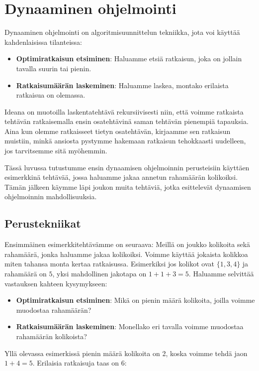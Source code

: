 \chapter{Dynaaminen ohjelmointi}

Dynaaminen ohjelmointi on algoritmisuunnittelun tekniikka,
jota voi käyttää kahdenlaisissa tilanteissa:

\begin{itemize}
\item \textbf{Optimiratkaisun etsiminen}: Haluamme etsiä ratkaisun,
joka on jollain tavalla suurin tai pienin.
\item \textbf{Ratkaisumäärän laskeminen}: Haluamme laskea,
montako erilaista ratkaisua on olemassa.
\end{itemize}

Ideana on muotoilla laskentatehtävä
rekursiivisesti niin, että voimme ratkaista tehtävän
ratkaisemalla ensin osatehtävinä saman tehtävän pienempiä tapauksia.
Aina kun olemme ratkaisseet tietyn osatehtävän,
kirjaamme sen ratkaisun muistiin, minkä ansiosta
pystymme hakemaan ratkaisun tehokkaasti uudelleen,
jos tarvitsemme sitä myöhemmin.

Tässä luvussa tutustumme ensin dynaamisen ohjelmoinnin perusteisiin
käyttäen esimerkkinä tehtävää, jossa haluamme jakaa annetun
rahamäärän kolikoiksi.
Tämän jälkeen käymme läpi joukon muita tehtäviä, jotka esittelevät
dynaamisen ohjelmoinnin mahdollisuuksia.

\section{Perustekniikat}

Ensimmäinen esimerkkitehtävämme on seuraava:
Meillä on joukko kolikoita sekä rahamäärä,
jonka haluamme jakaa kolikoiksi.
Voimme käyttää jokaista kolikkoa miten tahansa
monta kertaa ratkaisussa.
Esimerkiksi jos kolikot ovat $\{1,3,4\}$
ja rahamäärä on $5$, yksi mahdollinen
jakotapa on $1+1+3=5$.
Haluamme selvittää vastauksen kahteen kysymykseen:

\begin{itemize}
\item \textbf{Optimiratkaisun etsiminen}:
Mikä on pienin määrä kolikoita, joilla voimme muodostaa rahamäärän?
\item \textbf{Ratkaisumäärän laskeminen}:
Monellako eri tavalla voimme muodostaa rahamäärän kolikoista?
\end{itemize}

Yllä olevassa esimerkissä pienin määrä kolikoita on 2,
koska voimme tehdä jaon $1+4=5$. Erilaisia ratkaisuja taas on 6:

